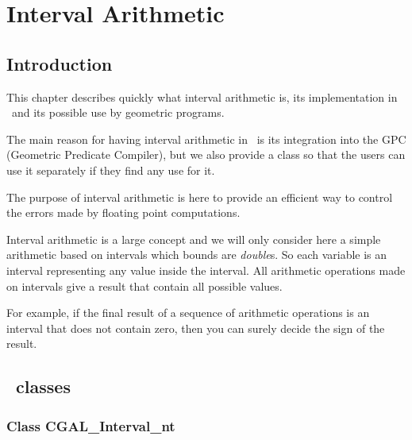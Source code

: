 



%

\chapter{Interval Arithmetic}

\section{Introduction}

This chapter describes quickly what interval arithmetic is, its implementation
in \cgal\ and its possible use by geometric programs.

The main reason for having interval arithmetic in \cgal\ is its integration into
the GPC (Geometric Predicate Compiler), but we also provide a class so that the
users can use it separately if they find any use for it.

The purpose of interval arithmetic is here to provide an efficient way to
control the errors made by floating point computations.

Interval arithmetic is a large concept and we will only consider here a simple
arithmetic based on intervals which bounds are {\it double}s.
So each variable is an interval representing any value inside the interval.
All arithmetic operations made on intervals give a result that contain all
possible values.

\smallskip

For example, if the final result of a sequence of arithmetic operations is an
interval that does not contain zero, then you can surely decide the sign of the
result.

\section{\cgal\ classes}

\subsection {Class CGAL\_Interval\_nt}

